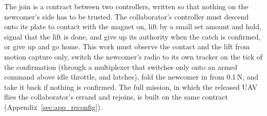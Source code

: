 The join is a contract between two controllers, written so that nothing on the newcomer's side has to be trusted. The
collaborator's controller must descend onto its plate to contact with the magnet on, lift by a small set amount and
hold, signal that the lift is done, and give up its authority when the catch is confirmed, or give up and go home. This
work must observe the contact and the lift from motion capture only, switch the newcomer's radio to its own tracker on
the tick of the confirmation (through a multiplexer that switches only onto an armed command above idle throttle, and
latches), fold the newcomer in from 0.1\,N, and take it back if nothing is confirmed. The full mission, in which the
released UAV flies the collaborator's errand and rejoins, is built on the same contract (Appendix~\ref{sec:app_reconfig}).

